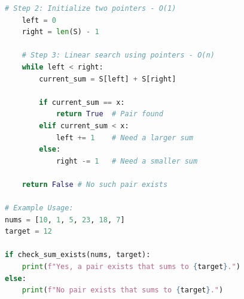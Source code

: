 \begin{questions}
\begin{solution}
\begin{lstlisting}[language=Python,numbers=none]
    # Step 2: Initialize two pointers - O(1)
    left = 0
    right = len(S) - 1
    
    # Step 3: Linear search using pointers - O(n)
    while left < right:
        current_sum = S[left] + S[right]
        
        if current_sum == x:
            return True  # Pair found
        elif current_sum < x:
            left += 1    # Need a larger sum
        else:
            right -= 1   # Need a smaller sum
            
    return False # No such pair exists

# Example Usage:
nums = [10, 1, 5, 23, 18, 7]
target = 12

if check_sum_exists(nums, target):
    print(f"Yes, a pair exists that sums to {target}.")
else:
    print(f"No pair exists that sums to {target}.")
\end{lstlisting}
\end{solution}

\end{questions}
